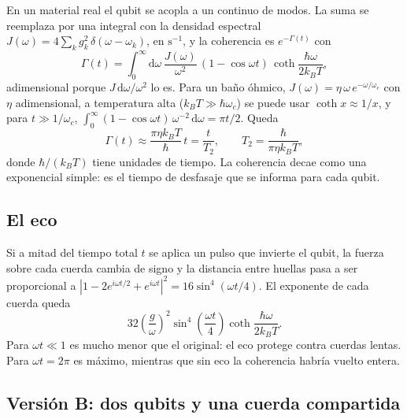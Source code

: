 \documentclass[11pt,a4paper]{article}
\begin{document}
En un material real el qubit se acopla a un continuo de modos. La suma se reemplaza por una integral con la densidad espectral $J(\omega) = 4\sum_k g_k^2\,\delta(\omega - \omega_k)$, en $\mathrm{s^{-1}}$, y la coherencia es $e^{-\Gamma(t)}$ con
\begin{equation}\label{eq:gamma}
\Gamma(t) = \int_0^\infty \mathrm{d}\omega\, \frac{J(\omega)}{\omega^2}\,(1 - \cos\omega t)\,\coth\frac{\hbar\omega}{2k_BT},
\end{equation}
adimensional porque $J\,\mathrm{d}\omega/\omega^2$ lo es. Para un baño óhmico, $J(\omega) = \eta\,\omega\, e^{-\omega/\omega_c}$ con $\eta$ adimensional, a temperatura alta ($k_BT \gg \hbar\omega_c$) se puede usar $\coth x \approx 1/x$, y para $t \gg 1/\omega_c$, $\int_0^\infty (1 - \cos\omega t)\,\omega^{-2}\,\mathrm{d}\omega = \pi t/2$. Queda
\begin{equation}\label{eq:T2}
\Gamma(t) \approx \frac{\pi\eta k_BT}{\hbar}\,t = \frac{t}{T_2}, \qquad T_2 = \frac{\hbar}{\pi\eta k_BT},
\end{equation}
donde $\hbar/(k_BT)$ tiene unidades de tiempo. La coherencia decae como una exponencial simple: es el tiempo de desfasaje que se informa para cada qubit.

\subsection{El eco}

Si a mitad del tiempo total $t$ se aplica un pulso que invierte el qubit, la fuerza sobre cada cuerda cambia de signo y la distancia entre huellas pasa a ser proporcional a $|1 - 2e^{i\omega t/2} + e^{i\omega t}|^2 = 16\sin^4(\omega t/4)$. El exponente de cada cuerda queda
\begin{equation}\label{eq:eco}
32\left(\frac{g}{\omega}\right)^2 \sin^4\!\left(\frac{\omega t}{4}\right)\coth\frac{\hbar\omega}{2k_BT}.
\end{equation}
Para $\omega t \ll 1$ es mucho menor que el original: el eco protege contra cuerdas lentas. Para $\omega t = 2\pi$ es máximo, mientras que sin eco la coherencia habría vuelto entera.

\subsection{Versión B: dos qubits y una cuerda compartida}\label{sec:modeloB}
\end{document}

